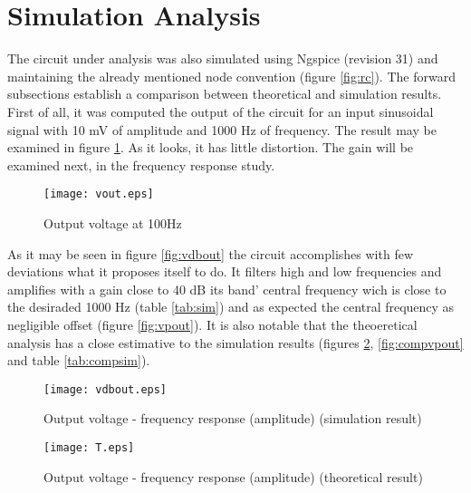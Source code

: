 \section{Simulation Analysis}
\label{sec:simulation}

The circuit under analysis was also simulated using Ngspice (revision 31) and maintaining the already mentioned node convention (figure \ref{fig:rc}). The forward subsections establish a comparison between theoretical and simulation results.
First of all, it was computed the output of the circuit for an input sinusoidal signal with 10 mV of amplitude and 1000 Hz of frequency. The result may be examined in figure \ref{fig:vout}. As it looks, it has little distortion. The gain will be examined next, in the frequency response study.



\begin{figure}[h] \centering
\texttt{[image: vout.eps]}%
\caption{Output voltage at 100Hz}
\label{fig:vout}
\end{figure}


As it may be seen in figure \ref{fig:vdbout} the circuit accomplishes with few deviations what it proposes itself to do. It filters high and low frequencies and amplifies with a gain close to 40 dB its band' central frequency wich is close to the desiraded 1000 Hz (table \ref{tab:sim}) and as expected the central frequency as negligible offset (figure \ref{fig:vpout}). It is also notable that the theoeretical analysis has a close estimative to the simulation  results (figures \ref{fig:compvdbout}, \ref{fig:compvpout} and table \ref{tab:compsim}).

\begin{figure}[h] \centering
  \begin{minipage}{.45\textwidth}
    \texttt{[image: vdbout.eps]}
    \caption{Output voltage - frequency response (amplitude) (simulation result)}
    \label{fig:vdbout}
  \end{minipage}%
    \hspace{2 mm}
  \begin{minipage}{.45\textwidth}
  \centering
    \texttt{[image: T.eps]}
    \caption{Output voltage - frequency response (amplitude) (theoretical result)}
    \label{fig:compvdbout}
      \end{minipage}%
\end{figure}

